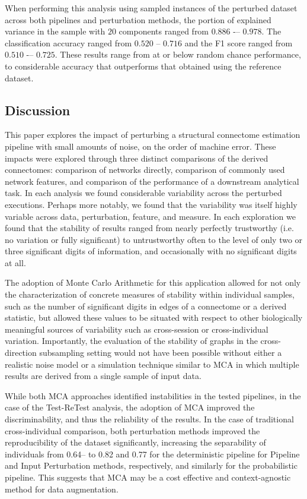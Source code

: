 \documentclass[fleqn,10pt]{SelfArx} %
\begin{document}
When performing this analysis using sampled instances of the perturbed dataset across both pipelines and perturbation
methods, the portion of explained variance in the sample with $20$ components ranged from $0.886$ -– $0.978$. The
classification accuracy ranged from $0.520$ – $0.716$ and the F1 score ranged from $0.510$ -– $0.725$. These results
range from at or below random chance performance, to considerable accuracy that outperforms that obtained using the
reference dataset.

\subsection*{Discussion}

This paper explores the impact of perturbing a structural connectome estimation pipeline with small amounts of noise, on the order of machine error. These impacts were explored through three distinct comparisons of the derived connectomes: comparison of networks directly, comparison of commonly used network features, and comparison of the performance of a downstream analytical task. In each analysis we found considerable variability across the perturbed executions. Perhaps more notably, we found that the variability was itself highly variable across data, perturbation, feature, and measure. In each exploration we found that the stability of results ranged from nearly perfectly trustworthy (i.e. no variation or fully significant) to untrustworthy often to the level of only two or three significant digits of information, and occasionally with no significant digits at all.

The adoption of Monte Carlo Arithmetic for this application allowed for not only the characterization of concrete measures of stability within individual samples, such as the number of significant digits in edges of a connectome or a derived statistic, but allowed these values to be situated with respect to other biologically meaningful sources of variability such as cross-session or cross-individual variation. Importantly, the evaluation of the stability of graphs in the cross-direction subsampling setting would not have been possible without either a realistic noise model or a simulation technique similar to MCA in which multiple results are derived from a single sample of input data.

While both MCA approaches identified instabilities in the tested pipelines, in the case of the Test-ReTest analysis, the adoption of MCA improved the discriminability, and thus the reliability of the results. In the case of traditional cross-individual comparison, both perturbation methods improved the reproducibility of the dataset significantly,  increasing the separability of individuals from 0.64– to 0.82 and 0.77 for the deterministic pipeline for Pipeline and Input Perturbation methods, respectively, and similarly for the probabilistic pipeline. This suggests that MCA may be a cost effective and context-agnostic method for data augmentation.
\end{document}
